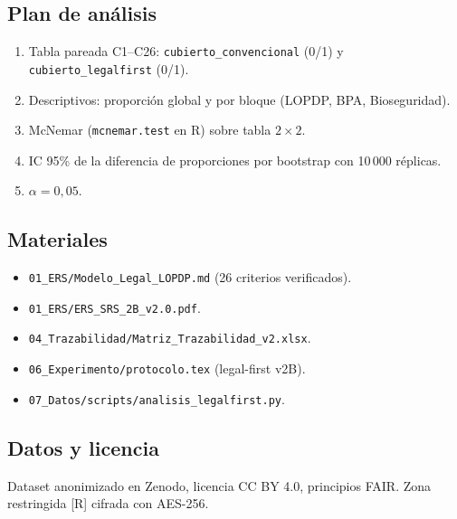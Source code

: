 \documentclass[11pt,a4paper]{article}
\begin{document}
\subsection*{Plan de an\'{a}lisis}
\begin{enumerate}[nosep]
  \item Tabla pareada C1--C26: \texttt{cubierto\_convencional} (0/1) y
        \texttt{cubierto\_legalfirst} (0/1).
  \item Descriptivos: proporci\'{o}n global y por bloque (LOPDP, BPA,
        Bioseguridad).
  \item McNemar (\texttt{mcnemar.test} en R) sobre tabla $2 \times 2$.
  \item IC 95\% de la diferencia de proporciones por bootstrap con 10\,000
        r\'{e}plicas.
  \item $\alpha = 0{,}05$.
\end{enumerate}

\subsection*{Materiales}
\begin{itemize}[nosep]
  \item \texttt{01\_ERS/Modelo\_Legal\_LOPDP.md} (26 criterios verificados).
  \item \texttt{01\_ERS/ERS\_SRS\_2B\_v2.0.pdf}.
  \item \texttt{04\_Trazabilidad/Matriz\_Trazabilidad\_v2.xlsx}.
  \item \texttt{06\_Experimento/protocolo.tex} (legal-first v2B).
  \item \texttt{07\_Datos/scripts/analisis\_legalfirst.py}.
\end{itemize}

\subsection*{Datos y licencia}
Dataset anonimizado en Zenodo, licencia CC BY 4.0, principios FAIR.
Zona restringida [R] cifrada con AES-256.
\end{document}
